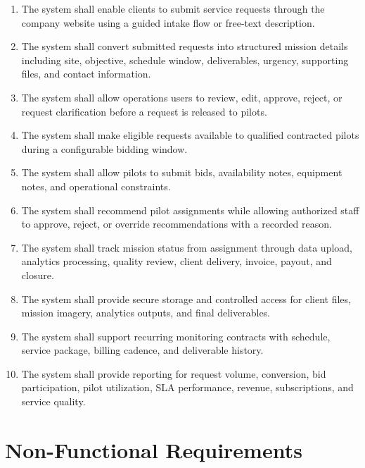 \documentclass[11pt,a4paper]{article}
\begin{document}
\begin{enumerate}[leftmargin=*]
    \item The system shall enable clients to submit service requests through the company website using a guided intake flow or free-text description.
    \item The system shall convert submitted requests into structured mission details including site, objective, schedule window, deliverables, urgency, supporting files, and contact information.
    \item The system shall allow operations users to review, edit, approve, reject, or request clarification before a request is released to pilots.
    \item The system shall make eligible requests available to qualified contracted pilots during a configurable bidding window.
    \item The system shall allow pilots to submit bids, availability notes, equipment notes, and operational constraints.
    \item The system shall recommend pilot assignments while allowing authorized staff to approve, reject, or override recommendations with a recorded reason.
    \item The system shall track mission status from assignment through data upload, analytics processing, quality review, client delivery, invoice, payout, and closure.
    \item The system shall provide secure storage and controlled access for client files, mission imagery, analytics outputs, and final deliverables.
    \item The system shall support recurring monitoring contracts with schedule, service package, billing cadence, and deliverable history.
    \item The system shall provide reporting for request volume, conversion, bid participation, pilot utilization, SLA performance, revenue, subscriptions, and service quality.
\end{enumerate}

\section{Non-Functional Requirements}
\end{document}
